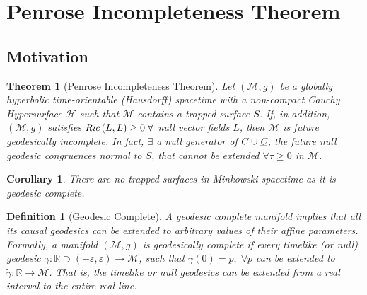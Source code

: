 \documentclass[12pt, a4paper]{report}
\theoremstyle{bfnote}
\newtheorem{theorem}{Theorem}[section]
\newtheorem{corollary}{Corollary}[theorem]
\newtheorem{definition}{Definition}[section]
\begin{document}
\section{Penrose Incompleteness Theorem}
\subsection{Motivation}
\begin{theorem}[Penrose Incompleteness Theorem]\label{incompletethm}
Let $\left(\mathcal{M}, g\right)$ be a globally hyperbolic
time-orientable (Hausdorff) spacetime with a non-compact Cauchy Hypersurface
$\mathcal{H}$ such that $\mathcal{M}$ contains a trapped surface $S$. If, in
addition, $\left(\mathcal{M}, g\right)$ satisfies $\text{\textit{Ric}}\left(L,
L\right) \geq 0 \;\forall$ null vector fields $L$, then $\mathcal{M}$ is future
geodesically incomplete. In fact, $\exists$ a null generator of $C \cup
\textit{\underbar{C}}$, the future null geodesic congruences normal to $S$, that cannot
be extended $\forall \tau \geq 0$ in $\mathcal{M}$.
\end{theorem}

\begin{corollary}{\label{MinkGeodcomplete}} 
    There are no trapped surfaces in Minkowski spacetime as it is geodesic complete.
\end{corollary}

\begin{definition}[Geodesic Complete]
    A geodesic complete manifold implies that all its causal geodesics can be
    extended to arbitrary values of their affine parameters. Formally, a
    manifold $\left(\mathcal{M}, g\right)$ is geodesically complete if every
    timelike (or null) geodesic $\gamma : \mathbb{R}\supset \left(-\varepsilon,
    \varepsilon\right) \to \mathcal{M}$, such that $\gamma\left(0\right) = p,
    \;\forall p$ can be extended to $\widetilde{\gamma} : \mathbb{R} \to
    \mathcal{M}$. That is, the timelike or null geodesics can be extended from a
    real interval to the entire real line. 
\end{definition}
\end{document}
